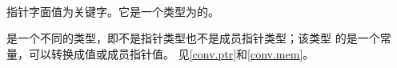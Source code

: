 
\paragraph{} %
指针字面值为关键字。它是一个类型为的\prvalue{}。

\begin{note}
  是一个不同的类型，即不是指针类型也不是成员指针类型；该类型
  的\prvalue{}是一个\nullp{}常量，可以转换成\nullp{}值或\Null{}成员指针值。
  见\ref{conv.ptr}和\ref{conv.mem}。
\end{note}

